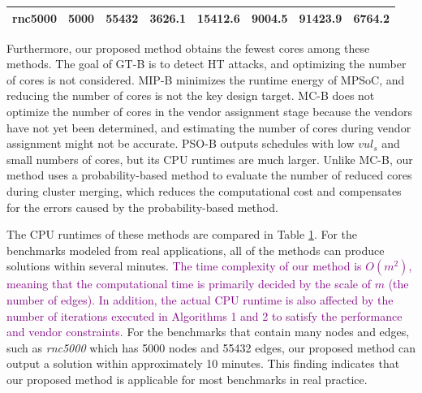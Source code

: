 \documentclass[10pt,journal, compsoc]{IEEEtran}
\begin{document}
\begin{table}[!b]
\begin{tabular}{c|c|c|c|c|c|c|c}
\hspace{-0.5em}rnc5000\hspace{-0.5em}   &\hspace{-0.5em}5000\hspace{-0.5em}   &\hspace{-0.5em}55432\hspace{-0.5em}  &\hspace{-0.5em}3626.1\hspace{-0.5em}  &\hspace{-0.5em}15412.6\hspace{-0.5em}  &\hspace{-0.5em}9004.5\hspace{-0.5em}   &\hspace{-0.5em}91423.9\hspace{-0.5em}  &\hspace{-0.8em}6764.2\hspace{-0.5em} \\

\hline
\hline
\end{tabular}
\label{table:runtime}
\end{table}








Furthermore, our proposed method obtains the fewest cores among these methods. The goal of GT-B is to detect HT attacks, and optimizing the number of cores is not considered. MIP-B minimizes the runtime energy of MPSoC, and reducing the number of cores is not the key design target. MC-B does not optimize the number of cores in the vendor assignment stage because the vendors have not yet been determined, and estimating the number of cores during vendor assignment might not be accurate. PSO-B outputs schedules with low $vul_s$ and small numbers of cores, but its CPU runtimes are much larger. Unlike MC-B, our method uses a probability-based method to evaluate the number of reduced cores during cluster merging, which reduces the computational cost and compensates for the errors caused by the probability-based method.





The CPU runtimes of these methods are compared in Table \ref{table:runtime}. For the benchmarks modeled from real applications, all of the methods can produce solutions within several minutes. \textcolor{purple}{The time complexity of our method is $O(m^2)$, meaning that the computational time is primarily decided by the scale of $m$ (the number of edges). In addition, the actual CPU runtime is also affected by the number of iterations executed in Algorithms 1 and 2 to satisfy the performance and vendor constraints.} For the benchmarks that contain many nodes and edges, such as \textit{rnc5000} which has 5000 nodes and 55432 edges, our proposed method can output a solution within approximately 10 minutes. This finding indicates that our proposed method is applicable for most benchmarks in real practice.
\end{document}
